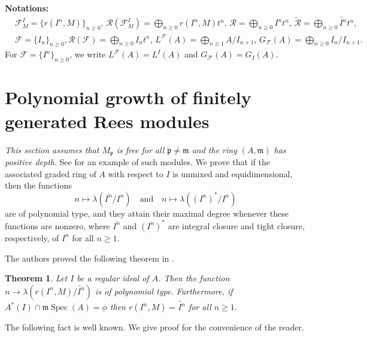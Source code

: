 \documentclass[11pt]{amsart}
\theoremstyle{plain}
\newtheorem{theorem}{Theorem}[section]
\newcommand{\p}{\mathfrak{p}}
\newcommand{\m}{\mathfrak{m}}
\newcommand{\R}{\mathcal{R}}
\newcommand{\F}{\mathcal{F}}
\newcommand{\wt}{\widetilde}
\newcommand{\Spec}{\operatorname{Spec}}
\theoremstyle{plain}
\begin{document}
\textbf{Notations:}
\begin{equation*}
    \begin{split}
       & \mathcal{F}^I_M=\{r(I^n,M)\}_{n\geq 0}, \,  \R(\F^I_M)=\bigoplus_{n\geq 0}r(I^n,M)t^n, \, \R=\bigoplus_{n\geq 0}I^nt^n, \, \wt{\R}=\bigoplus_{n\geq 0}\wt{I^n}t^n,   \\ & \F=\{I_n\}_{n\geq 0},  {\R}(\F)=\bigoplus_{n\geq 0}{I_n}t^n, \, {L}^{\F}(A)=\bigoplus_{n\geq 1}A/{I_{n+1}}, \, {G}_{\F}(A)=\bigoplus_{n\geq 0}{I_n}/{I_{n+1}}.
    \end{split}
\end{equation*}
For $\F=\{I^n\}_{n\geq 0}$, we write $L^{\F}(A)=L^I(A)$ and $G_{\F}(A)=G_I(A).$









\section{Polynomial growth of finitely generated Rees modules}

 \emph{This section assumes that $M_{\p}$ is free for all $\p \neq \m$ and the ring $(A,\m)$ has positive depth}. See \cite[section 6]{Zulfeqarr} for an example of such modules. We prove that if the associated graded ring of $A$ with respect to $I$ is unmixed and equidimensional, then the functions
$$n \mapsto \lambda(\overline{I^n}/I^n) \quad \text{and} \quad n \mapsto \lambda((I^n)^*/I^n)$$
are of polynomial type, and they attain their maximal degree whenever these functions are nonzero, where $\overline{I^n}$ and $(I^n)^*$ are integral closure and tight closure, respectively, of $I^n$ for all $n\geq 1$.

The authors proved the following theorem in \cite[Theorem 6.7]{Zulfeqarr}.

\begin{theorem}
 Let $I$ be a regular ideal of $A$. Then the function $n \to \lambda(r(I^n,M)/\widetilde{I^n})$ is of polynomial type. Furthermore, if $A^*(I) \cap \mathfrak{m}{\Spec}(A) = \phi$ then $r(I^n,M)=\widetilde{I^n}$ for all $n\geq 1$.
\end{theorem}


The following fact is well known. We give proof for the convenience of the reader.
\end{document}
